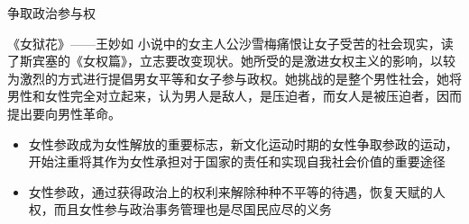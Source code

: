 \begin{frame}{争取政治参与权}
    \begin{block}{《女狱花》——王妙如}
        小说中的女主人公沙雪梅痛恨让女子受苦的社会现实，读了斯宾塞的《女权篇》，立志要改变现状。她所受的是激进女权主义的影响，以较为激烈的方式进行提倡男女平等和女子参与政权。她挑战的是整个男性社会，她将男性和女性完全对立起来，认为男人是敌人，是压迫者，而女人是被压迫者，因而提出要向男性革命。
    \end{block}
    \begin{block}{}
        \begin{itemize}
            \item 女性参政成为女性解放的重要标志，新文化运动时期的女性争取参政的运动，开始注重将其作为女性承担对于国家的责任和实现自我社会价值的重要途径
            \item 女性参政，通过获得政治上的权利来解除种种不平等的待遇，恢复天赋的人权，而且女性参与政治事务管理也是尽国民应尽的义务
        \end{itemize}
    \end{block}
\end{frame}
